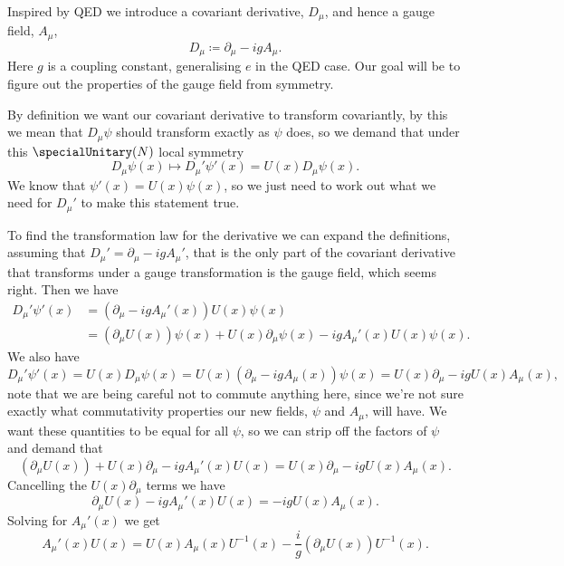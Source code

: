 \documentclass[fleqn]{NotesClass}
\newcommand{\covariantDerivative}{D}
\begin{document}
    Inspired by QED we introduce a covariant derivative, \(\covariantDerivative_\mu\), and hence a gauge field, \(A_\mu\),
    \begin{equation}
        \covariantDerivative_\mu \coloneqq \partial_\mu - igA_\mu.
    \end{equation}
    Here \(g\) is a coupling constant, generalising \(e\) in the QED case.
    Our goal will be to figure out the properties of the gauge field from symmetry.
    
    By definition we want our covariant derivative to transform covariantly, by this we mean that \(\covariantDerivative_\mu \psi\) should transform exactly as \(\psi\) does, so we demand that under this \(\specialUnitary(N)\) local symmetry
    \begin{equation}
        \covariantDerivative_\mu\psi(x) \mapsto \covariantDerivative_\mu'\psi'(x) = U(x)\covariantDerivative_\mu\psi(x).
    \end{equation}
    We know that \(\psi'(x) = U(x)\psi(x)\), so we just need to work out what we need for \(\covariantDerivative_\mu'\) to make this statement true.
    
    To find the transformation law for the derivative we can expand the definitions, assuming that \(D_\mu' = \partial_\mu - igA_\mu'\), that is the only part of the covariant derivative that transforms under a gauge transformation is the gauge field, which seems right.
    Then we have
    \begin{align}
        \covariantDerivative_\mu'\psi'(x) &= (\partial_\mu - igA_\mu'(x))U(x)\psi(x)\\
        &= (\partial_\mu U(x))\psi(x) + U(x)\partial_\mu\psi(x) - igA_\mu'(x)U(x)\psi(x).
    \end{align}
    We also have
    \begin{equation}
        \covariantDerivative_\mu'\psi'(x) = U(x)\covariantDerivative_\mu\psi(x) = U(x)(\partial_\mu - igA_\mu(x))\psi(x) = U(x)\partial_\mu - igU(x)A_\mu(x),
    \end{equation}
    note that we are being careful not to commute anything here, since we're not sure exactly what commutativity properties our new fields, \(\psi\) and \(A_\mu\), will have.
    We want these quantities to be equal for all \(\psi\), so we can strip off the factors of \(\psi\) and demand that
    \begin{equation}
        (\partial_\mu U(x)) + U(x)\partial_\mu - igA_\mu'(x)U(x) = U(x)\partial_\mu - igU(x)A_\mu(x).
    \end{equation}
    Cancelling the \(U(x)\partial_\mu\) terms we have
    \begin{equation}
        \partial_\mu U(x) - igA_\mu'(x)U(x) = -igU(x)A_\mu(x).
    \end{equation}
    Solving for \(A_\mu'(x)\) we get
    \begin{equation}
        A_\mu'(x)U(x) = U(x)A_\mu(x)U^{-1}(x) - \frac{i}{g}(\partial_\mu U(x))U^{-1}(x).
    \end{equation}
    
\end{document}
